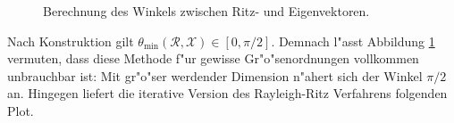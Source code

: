 \begin{figure}[h!]
\centering


\caption{Berechnung des Winkels zwischen Ritz- und Eigenvektoren.}\label{fig:chap5:winkel}
\end{figure}

Nach Konstruktion gilt $\theta_{\min}(\mathcal{R},\mathcal{X})\in[0,\pi/2]$.
Demnach l"asst Abbildung \ref{fig:chap5:winkel} vermuten, dass diese Methode f"ur gewisse Gr"o"senordnungen vollkommen unbrauchbar ist: Mit gr"o"ser werdender Dimension n"ahert sich der Winkel $\pi/2$ an. Hingegen liefert die iterative Version des Rayleigh-Ritz Verfahrens folgenden Plot.


